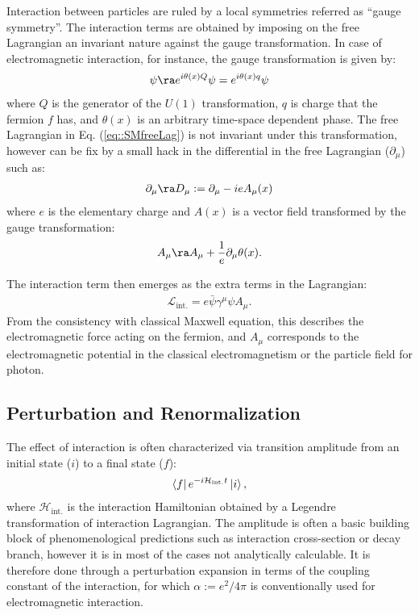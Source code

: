 Interaction between particles are ruled by a local symmetries referred as ``gauge symmetry''. 
The interaction terms are obtained by imposing on the free Lagrangian an invariant nature against the gauge transformation.
In case of electromagnetic interaction, for instance, the gauge transformation is given by:
\begin{align}
\psi \ra e^{i\theta(x) Q} \psi = e^{i\theta(x) q} \psi
\end{align}
where $Q$ is the generator of the $U(1)$ transformation, $q$ is charge that the fermion $f$ has, and $\theta(x)$ is an arbitrary time-space dependent phase.
The free Lagrangian in Eq. (\ref{eq::SMfreeLag}) is not invariant under this transformation, however can be fix by a small hack in the differential in the free Lagrangian ($\partial_\mu$) such as:
\begin{align}
\partial_\mu \ra D_\mu := \partial_\mu - ieA_\mu (x)
\end{align}
where $e$ is the elementary charge and $A(x)$ is a vector field transformed by the gauge transformation:
\begin{align}
A_\mu \ra A_\mu + \frac{1}{e} \partial_\mu \theta(x).
\end{align}

The interaction term then emerges as the extra terms in the Lagrangian:
\begin{align}
\mathcal{L}_{\mathrm{int.}} = e\bar{\psi} \gamma^\mu \psi A_\mu.
\label{eq::SMfreeLag}
\end{align}
From the consistency with classical Maxwell equation, this describes the electromagnetic force acting on the fermion, and $A_\mu$ corresponds to the electromagnetic potential in the classical electromagnetism or the particle field for photon. \\



\subsection{Perturbation and Renormalization}
The effect of interaction is often characterized via transition amplitude from an initial state ($i$) to a final state ($f$):
\begin{align}
\bra{f} e^{-i\mathcal{H}_{\mathrm{int.}}t} \ket{i},
\end{align}
where $\mathcal{H}_{\mathrm{int.}}$ is the interaction Hamiltonian obtained by a Legendre transformation of interaction Lagrangian. The amplitude is often a basic building block of phenomenological predictions such as interaction cross-section or decay branch, however it is in most of the cases not analytically calculable. It is therefore done through a perturbation expansion in terms of the coupling constant of the interaction, for which $\alpha := e^2/4\pi$ is conventionally used for electromagnetic interaction.  \\

